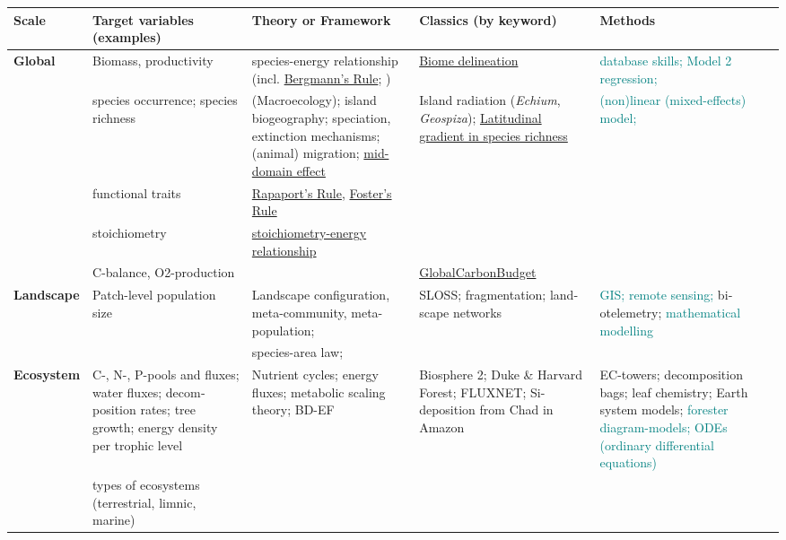 \documentclass[english,11pt,a4paper, landscape]{article}
\begin{document}
\noindent
\begin{tabularx}{\textwidth}{p{2cm}>{\raggedright\arraybackslash}X>{\raggedright\arraybackslash}X>{\raggedright\arraybackslash}X|>{\raggedright\arraybackslash}X}
	\hline
\textbf{Scale} & \textbf{Target variables (examples)} & \textbf{Theory or Frame­work} & \textbf{Classics (by keyword)} & \textbf{Methods}	\\	\hline

\textbf{Global}  & Biomass, productivity & species-energy relationship (incl. \href{https://en.wikipedia.org/wiki/Bergmann\%27s_rule}{Bergmann's Rule}; ) & \href{http://www.nature.com/articles/s41559-017-0089}{Biome delineation}& \textcolor{teal}{database skills; Model 2 regression;} \\
		& species occurrence; species richness & (Mac­roecology); island biogeography; speciation, extinction mechanisms; (animal) migration; \href{https://www.journals.uchicago.edu/doi/10.1086/382056}{mid-domain effect} & Island radiation (\emph{Echium}, \emph{Geospiza}); \href{https://www.annualreviews.org/doi/10.1146/annurev.ecolsys.34.012103.144032}{Latitudinal gradient in species richness}& \textcolor{teal}{(non)linear (mixed-effects) model;}\\
		& functional traits & \href{https://en.wikipedia.org/wiki/Rapoport\%27s_rule}{Rapaport's Rule}, \href{https://en.wikipedia.org/wiki/Foster\%27s_rule}{Foster's Rule} && \\
		& stoichiometry & \href{https://onlinelibrary.wiley.com/doi/10.1111/j.1600-0706.2013.00465.x}{stoichiometry-energy relationship} &&\\
		& C-balance, O2-production && \href{https://globalcarbonbudget.org/}{GlobalCarbonBudget}& \\ \hline

\rowcolor{lightgray}	
\textbf{Landscape} & Patch-level popu­lation size & Landscape configura­tion, meta-community, meta-population; & SLOSS; fragmentation; land­scape networks & \textcolor{teal}{GIS; remote sensing;} bi­otelemetry; \textcolor{teal}{mathematical modelling} \\
\rowcolor{lightgray}
		& & spe­cies-area law; & &\\ \hline

\rowcolor{lightgray}
\textbf{Ecosystem} & C-, N-, P-pools and fluxes; water fluxes; decom­position rates; tree growth; en­ergy density per trophic level & Nutrient cycles; energy fluxes; metabolic scaling theory; BD-EF  &  Biosphere 2; Duke \& Harvard Forest; FLUXNET; Si-deposition from Chad in Amazon & EC-towers; decomposition bags; leaf chemistry; Earth system models; \textcolor{teal}{forester diagram-models; ODEs (ordinary differential equations)}\\
\rowcolor{lightgray}
	& types of ecosystems (terrestrial, limnic, marine) & & & \\


\end{tabularx}
\end{document}
